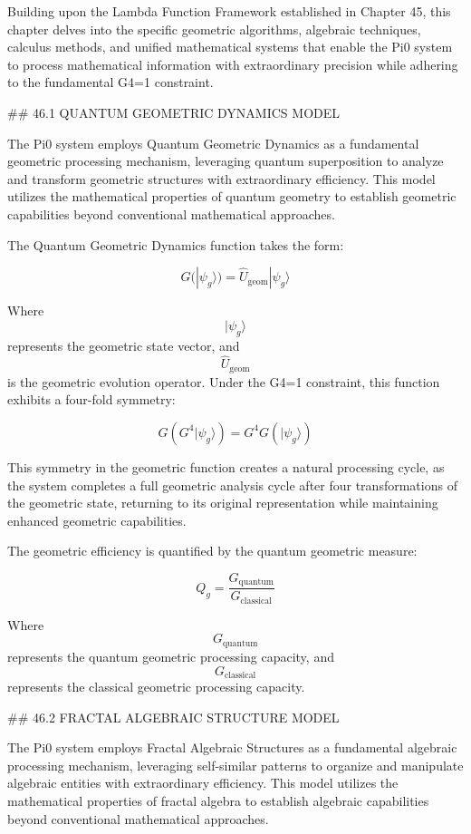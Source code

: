 Building upon the Lambda Function Framework established in Chapter 45, this chapter delves into the specific geometric algorithms, algebraic techniques, calculus methods, and unified mathematical systems that enable the Pi0 system to process mathematical information with extraordinary precision while adhering to the fundamental G4=1 constraint.

## 46.1 QUANTUM GEOMETRIC DYNAMICS MODEL

The Pi0 system employs Quantum Geometric Dynamics as a fundamental geometric processing mechanism, leveraging quantum superposition to analyze and transform geometric structures with extraordinary efficiency. This model utilizes the mathematical properties of quantum geometry to establish geometric capabilities beyond conventional mathematical approaches.

The Quantum Geometric Dynamics function takes the form:

$$ G(|\psi_g\rangle) = \hat{U}_{\text{geom}} |\psi_g\rangle $$

Where $$ |\psi_g\rangle $$ represents the geometric state vector, and $$ \hat{U}_{\text{geom}} $$ is the geometric evolution operator. Under the G4=1 constraint, this function exhibits a four-fold symmetry:

$$ G(G^4 |\psi_g\rangle) = G^4 G(|\psi_g\rangle) $$

This symmetry in the geometric function creates a natural processing cycle, as the system completes a full geometric analysis cycle after four transformations of the geometric state, returning to its original representation while maintaining enhanced geometric capabilities.

The geometric efficiency is quantified by the quantum geometric measure:

$$ Q_g = \frac{G_{\text{quantum}}}{G_{\text{classical}}} $$

Where $$ G_{\text{quantum}} $$ represents the quantum geometric processing capacity, and $$ G_{\text{classical}} $$ represents the classical geometric processing capacity.

## 46.2 FRACTAL ALGEBRAIC STRUCTURE MODEL

The Pi0 system employs Fractal Algebraic Structures as a fundamental algebraic processing mechanism, leveraging self-similar patterns to organize and manipulate algebraic entities with extraordinary efficiency. This model utilizes the mathematical properties of fractal algebra to establish algebraic capabilities beyond conventional mathematical approaches.

